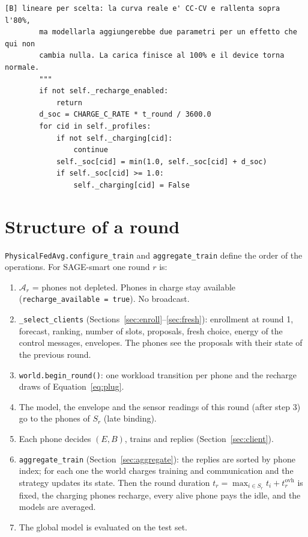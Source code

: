 \documentclass[11pt,a4paper]{article}
\newcommand{\cf}[1]{\texttt{#1}}
\begin{document}
\begin{lstlisting}[style=py,firstnumber=425,caption={\texttt{tesifl/device/world\_state.py}, lines 425--475}]
        [B] lineare per scelta: la curva reale e' CC-CV e rallenta sopra l'80%,
        ma modellarla aggiungerebbe due parametri per un effetto che qui non
        cambia nulla. La carica finisce al 100% e il device torna normale.
        """
        if not self._recharge_enabled:
            return
        d_soc = CHARGE_C_RATE * t_round / 3600.0
        for cid in self._profiles:
            if not self._charging[cid]:
                continue
            self._soc[cid] = min(1.0, self._soc[cid] + d_soc)
            if self._soc[cid] >= 1.0:
                self._charging[cid] = False
\end{lstlisting}

\newpage
\section{Structure of a round}
\label{sec:round}

\cf{PhysicalFedAvg.configure\_train} and \cf{aggregate\_train} define the order
of the operations. For SAGE-smart one round $r$ is:
\begin{enumerate}
  \item $\mathcal{A}_r$ = phones not depleted. Phones in charge stay available
        (\cf{recharge\_available = true}). No broadcast.
  \item \cf{\_select\_clients} (Sections~\ref{sec:enroll}--\ref{sec:fresh}):
        enrollment at round 1, forecast, ranking, number of slots, proposals,
        fresh choice, energy of the control messages, envelopes. The phones see
        the proposals with their state of the previous round.
  \item \cf{world.begin\_round()}: one workload transition per phone and the
        recharge draws of Equation~\eqref{eq:plug}.
  \item The model, the envelope and the sensor readings of this round (after
        step 3) go to the phones of $S_r$ (late binding).
  \item Each phone decides $(E, B)$, trains and replies
        (Section~\ref{sec:client}).
  \item \cf{aggregate\_train} (Section~\ref{sec:aggregate}): the replies are
        sorted by phone index; for each one the world charges training and
        communication and the strategy updates its state. Then the round
        duration $t_r = \max_{i \in S_r} t_i + t^{\mathrm{ovh}}_r$ is fixed,
        the charging phones recharge, every alive phone pays the idle, and the
        models are averaged.
  \item The global model is evaluated on the test set.
\end{enumerate}
\end{document}
